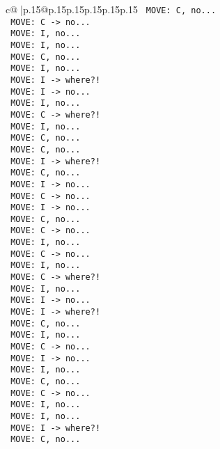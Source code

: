 \documentclass{article}
\begin{document}
{\begin{supertabular}{c@{$\;$}|p{.15\linewidth}@{}p{.15\linewidth}p{.15\linewidth}p{.15\linewidth}p{.15\linewidth}p{.15\linewidth}}
{{{\texttt{ MOVE: C, no...} \\
\texttt{ MOVE: C {-}> no...} \\
\texttt{ MOVE: I, no...} \\
\texttt{ MOVE: I, no...} \\
\texttt{ MOVE: C, no...} \\
\texttt{ MOVE: I, no...} \\
\texttt{ MOVE: I {-}> where?!} \\
\texttt{ MOVE: I {-}> no...} \\
\texttt{ MOVE: I, no...} \\
\texttt{ MOVE: C {-}> where?!} \\
\texttt{ MOVE: I, no...} \\
\texttt{ MOVE: C, no...} \\
\texttt{ MOVE: C, no...} \\
\texttt{ MOVE: I {-}> where?!} \\
\texttt{ MOVE: C, no...} \\
\texttt{ MOVE: I {-}> no...} \\
\texttt{ MOVE: C {-}> no...} \\
\texttt{ MOVE: I {-}> no...} \\
\texttt{ MOVE: C, no...} \\
\texttt{ MOVE: C {-}> no...} \\
\texttt{ MOVE: I, no...} \\
\texttt{ MOVE: C {-}> no...} \\
\texttt{ MOVE: I, no...} \\
\texttt{ MOVE: C {-}> where?!} \\
\texttt{ MOVE: I, no...} \\
\texttt{ MOVE: I {-}> no...} \\
\texttt{ MOVE: I {-}> where?!} \\
\texttt{ MOVE: C, no...} \\
\texttt{ MOVE: I, no...} \\
\texttt{ MOVE: C {-}> no...} \\
\texttt{ MOVE: I {-}> no...} \\
\texttt{ MOVE: I, no...} \\
\texttt{ MOVE: C, no...} \\
\texttt{ MOVE: C {-}> no...} \\
\texttt{ MOVE: I, no...} \\
\texttt{ MOVE: I, no...} \\
\texttt{ MOVE: I {-}> where?!} \\
\texttt{ MOVE: C, no...} \\
}}}
\end{supertabular}}
\end{document}
